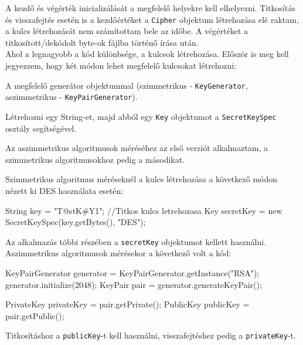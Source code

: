 A kezdő és végérték inicializálását a megfelelő helyekre kell elhelyezni. Titkosítás és visszafejtés esetén is a kezdőértéket a \texttt{Cipher} objektum létrehozása elé raktam, a kulcs létrehozását nem számítottam bele az időbe. A végértéket a titkosított/dekódolt byte-ok fájlba történő írása után.
\vspace{15pt} \\Ahol a legnagyobb a kód különbsége, a kulcsok létrehozása. Először is meg kell jegyezzem, hogy két módon lehet megfelelő kulcsokat létrehozni:

A megfelelő generátor objektummal (szimmetrikus - \texttt{KeyGenerator}, aszimmetrikus - \texttt{KeyPairGenerator}).

Létrehozni egy String-et, majd abból egy \texttt{Key} objektumot a \texttt{SecretKeySpec} osztály segítségével.

Az aszimmetrikus algoritmusok méréséhez az első verziót alkalmaztam, a szimmetrikus algoritmusokhoz pedig a másodikat.

Szimmetrikus algoritmus méréseknél a kulcs létrehozása a következő módon nézett ki DES használata esetén:
\begin{java}
String key = "T@stK#Y1";
//Titkos kulcs letrehozasa
Key secretKey = new SecretKeySpec(key.getBytes(), "DES");
\end{java}
Az alkalmazás többi részében a \texttt{secretKey} objektumot kellett használni.
\vspace{7pt}\\Aszimmetrikus algoritmusok mérésekor a következő volt a kód:
\begin{java}
KeyPairGenerator generator = 
			KeyPairGenerator.getInstance("RSA");
generator.initialize(2048);
KeyPair pair = generator.generateKeyPair();
	
PrivateKey privateKey = pair.getPrivate();
PublicKey publicKey = pair.getPublic();
\end{java}
Titkosításhoz a \texttt{publicKey}-t kell használni, visszafejtéshez pedig a \texttt{privateKey}-t.


